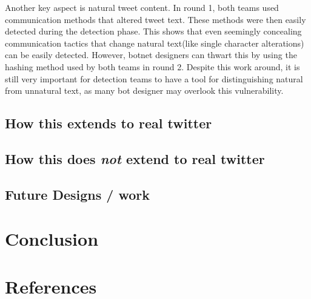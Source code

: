 \documentclass[11pt, oneside]{article} %
\numberwithin{equation}{section} %
\numberwithin{figure}{section} %
\numberwithin{table}{section} %
\begin{document}
		Another key aspect is natural tweet content.  In round 1, both teams used communication methods that altered tweet text.  These methods were then easily detected during the detection phase.  This shows that even seemingly concealing communication tactics that change natural text(like single character alterations) can be easily detected.  However, botnet designers can thwart this by using the hashing method used by both teams in round 2.  Despite this work around, it is still very important for detection teams to have a tool for distinguishing natural from unnatural text, as many bot designer may overlook this vulnerability.

	\subsection{How this extends to real twitter}
	\subsection{How this does \textit{not} extend to real twitter}
	\subsection{Future Designs / work}

\section{Conclusion}


\clearpage
\section{References}
\end{document}
